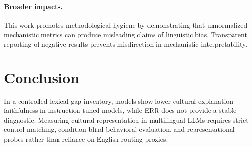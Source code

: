 \documentclass{article}
\begin{document}
\paragraph{Broader impacts.}
This work promotes methodological hygiene by demonstrating that unnormalized mechanistic metrics can produce misleading claims of linguistic bias. Transparent reporting of negative results prevents misdirection in mechanistic interpretability.

\section{Conclusion}

In a controlled lexical-gap inventory, models show lower cultural-explanation faithfulness in instruction-tuned models, while ERR does not provide a stable diagnostic. Measuring cultural representation in multilingual LLMs requires strict control matching, condition-blind behavioral evaluation, and representational probes rather than reliance on English routing proxies.
\end{document}
